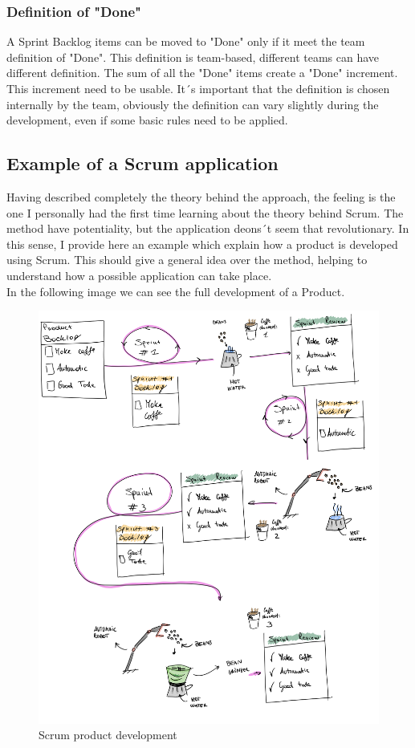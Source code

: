 \documentclass[../main.tex]{subfiles}
\begin{document}
\subsubsection{Definition of "Done"}
A Sprint Backlog items can be moved to "Done" only if it meet the team definition of "Done". This definition is team-based, different teams can have different definition. The sum of all the "Done" items create a "Done" increment. This increment need to be usable. It´s important that the definition is chosen internally by the team, obviously the definition can vary slightly during the development, even if some basic rules need to be applied.
\subsection{Example of a Scrum application}
Having described completely the theory behind the approach, the feeling is the one I personally had the first time learning about the theory behind Scrum. The method have potentiality, but the application deons´t seem that revolutionary. In this sense, I provide here an example which explain how a product is developed using Scrum. This should give a general idea over the method, helping to understand how a possible application can take place. \\
In the following image we can see the full development of a Product.\\
\begin{figure}[htp]
    \centering
    \includegraphics[width=\linewidth]{images_folder/scrum.png}
    \caption{Scrum product development}
    \label{fig:scrumprddev}
\end{figure}
\end{document}

